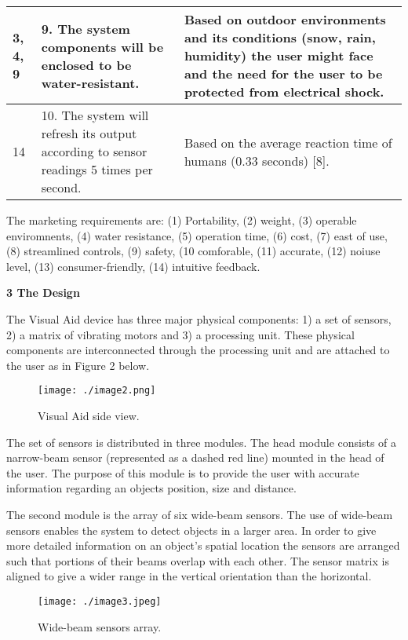 \begin{table}[h]
\begin{tabular}{|p{2cm}|p{5cm}|p{6cm}|}
3, 4, 9 & 
		9. The system components will be enclosed to be water-resistant.	&
		Based on outdoor environments and its conditions (snow,
		rain, humidity) the user might face and the need for the user to be 
		protected from electrical shock. \\ \hline

14 & 
		10. The system will refresh its output according to sensor readings 5
		  times per second. &
		Based on the average reaction time of humans (0.33 seconds) {[}8{]}. \\ \hline

\end{tabular}
\end{table}

The marketing requirements are: (1) Portability, (2) weight, (3) operable enviromnents, 
(4) water resistance, (5) operation time, (6) cost, (7) east of use, 
(8) streamlined controls, (9) safety, (10 comforable, (11) accurate, (12) noiuse level, 
(13) consumer-friendly, (14) intuitive feedback.


\textbf{3 The Design}

The Visual Aid device has three major physical components: 1) a set of
sensors, 2) a matrix of vibrating motors and 3) a processing unit. These
physical components are interconnected through the processing unit and
are attached to the user as in Figure 2 below.


\begin{figure}[h]
\texttt{[image: ./image2.png]}
\caption{Visual Aid side view.}
\label{figure:caseStudySideView}
\end{figure}

The set of sensors is distributed in three modules. The head module
consists of a narrow-beam sensor (represented as a dashed red line)
mounted in the head of the user. The purpose of this module is to
provide the user with accurate information regarding an objects
position, size and distance.

The second module is the array of six wide-beam sensors. The use of
wide-beam sensors enables the system to detect objects in a larger area.
In order to give more detailed information on an object's spatial
location the sensors are arranged such that portions of their beams
overlap with each other. The sensor matrix is aligned to give a wider
range in the vertical orientation than the horizontal.

\begin{figure}[h]
\texttt{[image: ./image3.jpeg]}
\caption{Wide-beam sensors array.}
\label{figure:caseStudyWideBeam}
\end{figure}

